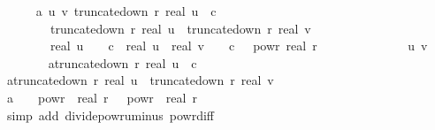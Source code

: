 \begin{isabellebody}
\isanewline
\ \ \ \ \isamarkupfalse%
\ a{}{\isacharunderscore}{\kern0pt}{}{\isacharcolon}{\kern0pt}\ {\isachardoublequoteopen}{\isasymAnd}u\ v{\isachardot}{\kern0pt}\ truncate{\isacharunderscore}{\kern0pt}down\ r\ {\isacharparenleft}{\kern0pt}real\ u{\isacharparenright}{\kern0pt}\ {\isasymle}\ c\ {\isasymLongrightarrow}\ \isanewline
\ \ \ \ \ \ \ \ truncate{\isacharunderscore}{\kern0pt}down\ r\ {\isacharparenleft}{\kern0pt}real\ u{\isacharparenright}{\kern0pt}\ {\isacharequal}{\kern0pt}\ truncate{\isacharunderscore}{\kern0pt}down\ r\ {\isacharparenleft}{\kern0pt}real\ v{\isacharparenright}{\kern0pt}\ {\isasymLongrightarrow}\isanewline
\ \ \ \ \ \ \ \ real\ u\ {\isasymle}\ {}\ {\isacharasterisk}{\kern0pt}\ c\ {\isasymand}\ {\isasymbar}real\ u\ {\isacharminus}{\kern0pt}\ real\ v{\isasymbar}\ {\isasymle}\ {}\ {\isacharasterisk}{\kern0pt}\ c\ {\isacharasterisk}{\kern0pt}\ {}\ powr\ {\isacharparenleft}{\kern0pt}{\isacharminus}{\kern0pt}real\ r{\isacharparenright}{\kern0pt}{\isachardoublequoteclose}\isanewline
\ \ \ \ \isamarkupfalse%
\ {\isacharminus}{\kern0pt}\isanewline
\ \ \ \ \ \ \isamarkupfalse%
\ u\ v\isanewline
\ \ \ \ \ \ \isamarkupfalse%
\ a{\isacharunderscore}{\kern0pt}{}{\isacharcolon}{\kern0pt}{\isachardoublequoteopen}truncate{\isacharunderscore}{\kern0pt}down\ r\ {\isacharparenleft}{\kern0pt}real\ u{\isacharparenright}{\kern0pt}\ {\isasymle}\ c{\isachardoublequoteclose}\isanewline
\ \ \ \ \ \ \isamarkupfalse%
\ a{\isacharunderscore}{\kern0pt}{}{\isacharcolon}{\kern0pt}{\isachardoublequoteopen}truncate{\isacharunderscore}{\kern0pt}down\ r\ {\isacharparenleft}{\kern0pt}real\ u{\isacharparenright}{\kern0pt}\ {\isacharequal}{\kern0pt}\ truncate{\isacharunderscore}{\kern0pt}down\ r\ {\isacharparenleft}{\kern0pt}real\ v{\isacharparenright}{\kern0pt}{\isachardoublequoteclose}\isanewline
\ \ \ \ \ \ \isamarkupfalse%
\ a{\isacharunderscore}{\kern0pt}{}{\isacharcolon}{\kern0pt}\ {\isachardoublequoteopen}{}\ {\isacharasterisk}{\kern0pt}\ {}\ powr\ {\isacharparenleft}{\kern0pt}{\isacharminus}{\kern0pt}\ real\ r{\isacharparenright}{\kern0pt}\ {\isacharequal}{\kern0pt}\ {}\ powr\ {\isacharparenleft}{\kern0pt}{}\ {\isacharminus}{\kern0pt}real\ r{\isacharparenright}{\kern0pt}{\isachardoublequoteclose}\isanewline
\ \ \ \ \ \ \ \ \isamarkupfalse%
\ {\isacharparenleft}{\kern0pt}simp\ add{\isacharcolon}{\kern0pt}\ divide{\isacharunderscore}{\kern0pt}powr{\isacharunderscore}{\kern0pt}uminus\ powr{\isacharunderscore}{\kern0pt}diff{\isacharparenright}{\kern0pt}\isanewline

\end{isabellebody}
